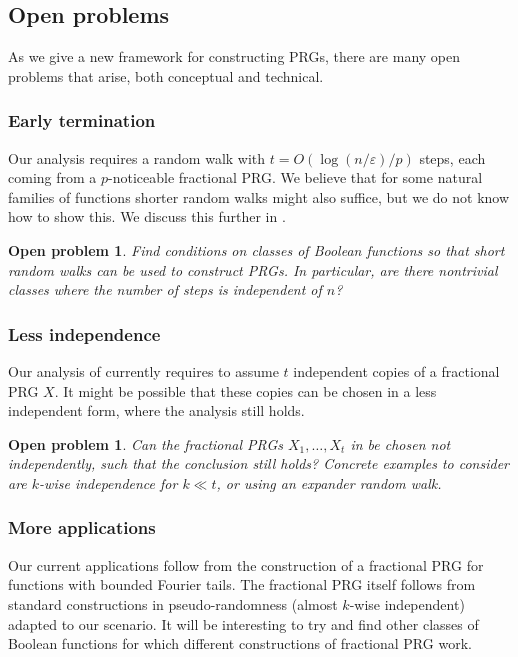 \documentclass{toc}
\newcommand{\eps}{\varepsilon}
\newtheorem{open}[theorem]{Open problem}
\begin{document}
\subsection{Open problems}
As we give a new framework for constructing PRGs,
there are many open problems that arise, both conceptual and technical.

\subsubsection{Early termination}
Our analysis requires a random walk with $t=O(\log(n/\eps)/p)$ steps, each coming from a $p$-noticeable fractional PRG\@.
We believe that for some natural families of functions shorter random walks might also suffice, but we do not
know how to show this. We discuss this further in .


\begin{open}
\label{open:early_termination}
Find conditions on classes of Boolean functions so that short random walks can be used to construct PRGs.
In particular, are there nontrivial classes where the number of steps is independent of $n$?
\end{open}

\subsubsection{Less independence}
Our analysis of  currently requires to assume $t$ independent copies of a fractional PRG $X$. It might be possible that these copies can be chosen in a less independent form, where the analysis still holds.

\begin{open}
Can the fractional PRGs $X_1,\ldots,X_t$ in  be chosen not independently, such that the conclusion still holds? Concrete examples to consider are $k$-wise independence for $k \ll t$, or using an expander random walk.
\end{open}


\subsubsection{More applications}
Our current applications follow from the construction of a fractional PRG for functions with bounded Fourier tails.
The fractional PRG itself follows from standard constructions in pseudo-randomness (almost $k$-wise independent)
adapted to our scenario. It will be interesting to try and find other classes of Boolean functions for which different constructions of fractional PRG work.
\end{document}

